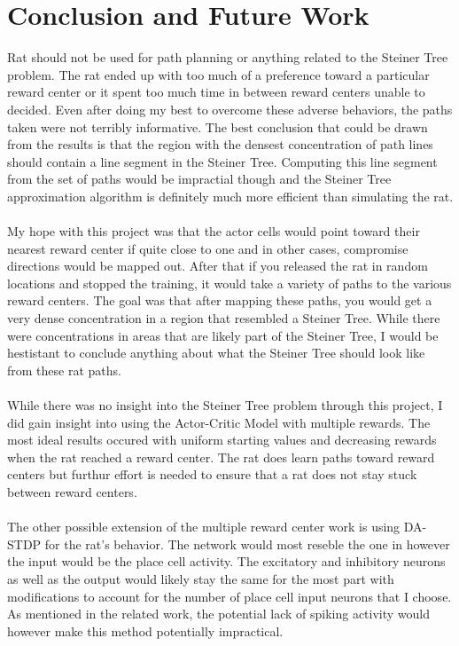 \documentclass[conference]{IEEEtran}
\begin{document}
\section{Conclusion and Future Work}

Rat should not be used for path planning or anything related to the Steiner Tree problem. The rat ended up with too much of a preference toward a particular reward center or it spent too much time in between reward centers unable to decided. Even after doing my best to overcome these adverse behaviors, the paths taken were not terribly informative. The best conclusion that could be drawn from the results is that the region with the densest concentration of path lines should contain a line segment in the Steiner Tree. Computing this line segment from the set of paths would be impractial though and the Steiner Tree approximation algorithm is definitely much more efficient than simulating the rat. \\
\\
My hope with this project was that the actor cells would point toward their nearest reward center if quite close to one and in other cases, compromise directions would be mapped out. After that if you released the rat in random locations and stopped the training, it would take a variety of paths to the various reward centers. The goal was that after mapping these paths, you would get a very dense concentration in a region that resembled a Steiner Tree. While there were concentrations in areas that are likely part of the Steiner Tree, I would be hestistant to conclude anything about what the Steiner Tree should look like from these rat paths. \\
\\
While there was no insight into the Steiner Tree problem through this project, I did gain insight into using the Actor-Critic Model with multiple rewards. The most ideal results occured with uniform starting values and decreasing rewards when the rat reached a reward center. The rat does learn paths toward reward centers but furthur effort is needed to ensure that a rat does not stay stuck between reward centers.\\
\\
The other possible extension of the multiple reward center work is using DA-STDP for the rat's behavior. The network would most reseble the one in \cite{plosone} however the input would be the place cell activity. The excitatory and inhibitory neurons as well as the output would likely stay the same for the most part with modifications to account for the number of place cell input neurons that I choose. As mentioned in the related work, the potential lack of spiking activity would however make this method potentially impractical.
\end{document}
